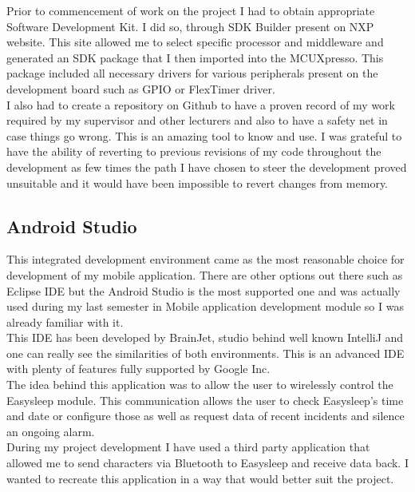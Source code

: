 \documentclass[12pt,a4paper]{article}
\begin{document}
		Prior to commencement of work on the project I had to obtain appropriate Software
		Development Kit. I did so, through SDK Builder present on NXP website. This site allowed 
		me to select specific processor and middleware and generated an SDK package that I then 
		imported into the MCUXpresso. This package included all necessary drivers for various 
		peripherals present on the development board such as GPIO or FlexTimer driver.\\
		
		I also had to create a repository on Github to have a proven record of my work required 
		by my supervisor and other lecturers and also to have a safety net in case things go 
		wrong. This is an amazing tool to know and use. I was grateful to have the ability of 
		reverting to previous revisions of my code throughout the development as few times the  
		path I have chosen to steer the development proved unsuitable and it would have been  
		impossible to revert changes from memory.
		\newpage
	
		\subsection{Android Studio} 
		
		This integrated development environment came as the most reasonable choice for development of my mobile application. There are other options out there such as Eclipse IDE but the Android Studio is the most supported one and was actually used during my last semester in Mobile application development module so I was already familiar with it.\\ 
		
		This IDE has been developed by BrainJet, studio behind well known IntelliJ and one can really see the similarities of both environments. This is an advanced IDE with plenty of features fully supported by Google Inc.\\ 
		
		The idea behind this application was to allow the user to wirelessly control the Easysleep module. This communication allows the user to check Easysleep's time and date or configure those as well as request data of recent incidents and silence an ongoing alarm.\\
		
		During my project development I have used a third party application that allowed me to send characters via Bluetooth to Easysleep and receive data back. I wanted to recreate this application in a way that would better suit the project.\\ 
		
\end{document}
